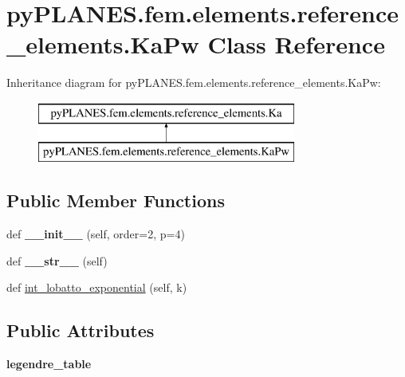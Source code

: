 \hypertarget{classpy_p_l_a_n_e_s_1_1fem_1_1elements_1_1reference__elements_1_1_ka_pw}{}\section{py\+P\+L\+A\+N\+E\+S.\+fem.\+elements.\+reference\+\_\+elements.\+Ka\+Pw Class Reference}
\label{classpy_p_l_a_n_e_s_1_1fem_1_1elements_1_1reference__elements_1_1_ka_pw}
Inheritance diagram for py\+P\+L\+A\+N\+E\+S.\+fem.\+elements.\+reference\+\_\+elements.\+Ka\+Pw\+:\begin{figure}[H]
\begin{center}
\leavevmode
\includegraphics[height=2.000000cm]{classpy_p_l_a_n_e_s_1_1fem_1_1elements_1_1reference__elements_1_1_ka_pw}
\end{center}
\end{figure}
\subsection*{Public Member Functions}
\begin{DoxyCompactItemize}
\item 
\mbox{\label{classpy_p_l_a_n_e_s_1_1fem_1_1elements_1_1reference__elements_1_1_ka_pw_a03e6f12c436eaba31d4de7fcc7f23b0d}} 
def {\bfseries \+\_\+\+\_\+init\+\_\+\+\_\+} (self, order=2, p=4)
\item 
\mbox{\label{classpy_p_l_a_n_e_s_1_1fem_1_1elements_1_1reference__elements_1_1_ka_pw_a937d49ce67fa847f5879c3318781de7d}} 
def {\bfseries \+\_\+\+\_\+str\+\_\+\+\_\+} (self)
\item 
def \mbox{\hyperlink{classpy_p_l_a_n_e_s_1_1fem_1_1elements_1_1reference__elements_1_1_ka_pw_ad87153ff42e7a432a2922bb67ac7b7be}{int\+\_\+lobatto\+\_\+exponential}} (self, k)
\end{DoxyCompactItemize}
\subsection*{Public Attributes}
\begin{DoxyCompactItemize}
\item 
\mbox{\label{classpy_p_l_a_n_e_s_1_1fem_1_1elements_1_1reference__elements_1_1_ka_pw_a90571945e1cb1e11ea5eb5df8e703771}} 
{\bfseries legendre\+\_\+table}
\end{DoxyCompactItemize}


